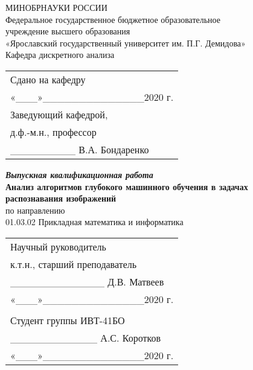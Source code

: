 \begin{titlepage}
  \begin{center}  
    МИНОБРНАУКИ   РОССИИ\\  
    Федеральное государственное бюджетное образовательное\\
    учреждение высшего образования\\  
    «Ярославский государственный университет им. П.Г. Демидова»\\  
    \vspace{1em}
    Кафедра дискретного анализа
  \end{center}
  \vspace{1em}
  \null\hfill\begin{tabular}{l@{}}
    Сдано на кафедру\\
    «\_\_\_»\_\_\_\_\_\_\_\_\_\_\_\_\_\_2020 г.\\
    Заведующий кафедрой,\\
    д.ф.-м.н., профессор\\
    \_\_\_\_\_\_\_\_\_ В.А. Бондаренко\\
  \end{tabular}
  \vspace{2em}
  \begin{center}
    \textbf{\textit{Выпускная квалификационная работа}}\\    
    \vspace{1em}
    \textbf{Анализ алгоритмов глубокого машинного обучения в задачах \\ распознавания изображений}\\
    \vspace{1em}
    по направлению \\ 01.03.02 Прикладная математика и информатика\\
  \end{center}
  \vspace{1em}
  \null\hfill\begin{tabular}{l@{}}
    Научный руководитель\\
    к.т.н., старший преподаватель\\
    \_\_\_\_\_\_\_\_\_\_\_\_\_ Д.В. Матвеев\\
    «\_\_\_»\_\_\_\_\_\_\_\_\_\_\_\_\_\_2020 г.\\
  \vspace{1em}\\
    Студент группы ИВТ-41БО\\
    \_\_\_\_\_\_\_\_\_\_\_\_ А.С. Коротков\\
    «\_\_\_»\_\_\_\_\_\_\_\_\_\_\_\_\_\_2020 г.\\
  \end{tabular}
  \vfill
\end{titlepage}
\clearpage